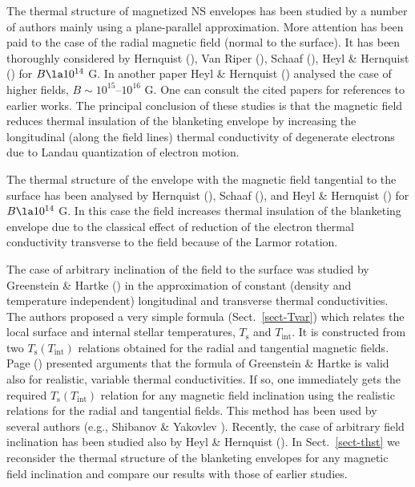 \documentclass{aa}
\begin{document}
The thermal structure of magnetized NS
envelopes has been studied
by a number of authors mainly using a
plane-parallel approximation.
More attention has been paid to the
case of the radial magnetic field (normal to the surface).
It has been thoroughly considered by Hernquist (\cite{hern85}),
Van Riper (\cite{kvr88}), Schaaf (\cite{schaaf90a}),
Heyl \& Hernquist (\cite{hh-multi}) for $B \la 10^{14}$ G.
In another paper
Heyl \& Hernquist (\cite{hh-theory})
analysed the case of higher fields, $B \sim 10^{15}$--$10^{16}$ G.
One can consult the cited papers for references to
earlier works. The principal conclusion
of these studies is that
the magnetic field reduces thermal insulation
of the blanketing envelope by increasing
the longitudinal (along the field lines) thermal
conductivity of degenerate electrons due to Landau
quantization of electron motion.

The thermal structure of the envelope with the magnetic field
tangential to the surface has been analysed by
Hernquist (\cite{hern85}), Schaaf (\cite{schaaf90a}),
and Heyl \& Hernquist (\cite{hh-theory}) for $B \la 10^{14}$ G.
In this case the field increases thermal insulation
of the blanketing envelope due to the classical
effect of reduction of the electron thermal conductivity
transverse to the field because of the Larmor rotation.

The case of arbitrary inclination of the field to
the surface was studied by Greenstein \&
Hartke (\cite{gh83}) in the approximation
of constant (density and temperature independent)
longitudinal and transverse thermal conductivities.
The authors proposed a very simple formula (Sect.\ \ref{sect-Tvar})
which relates the local  
 surface and internal stellar temperatures, $T_\mathrm{s}$
and $T_\mathrm{int}$.
It is constructed from two $T_\mathrm{s}(T_\mathrm{int})$ 
relations obtained
for the radial and tangential magnetic fields.
Page (\cite{page95}) presented arguments that the formula
of Greenstein \& Hartke is valid also for realistic,
variable thermal conductivities. If so, one
immediately gets the required $T_\mathrm{s}(T_\mathrm{int})$
relation for any magnetic field
inclination using the realistic relations for the radial
and tangential fields.
This method has been used by several authors
(e.g., Shibanov \& Yakovlev \cite{shibyak}).
Recently, the case of arbitrary field inclination
has been studied also by Heyl \& Hernquist (\cite{hh-multi}).
In Sect.\ \ref{sect-thst} we reconsider the
thermal structure of the blanketing envelopes
for any magnetic field inclination and compare our results
with those of earlier studies.
\end{document}
